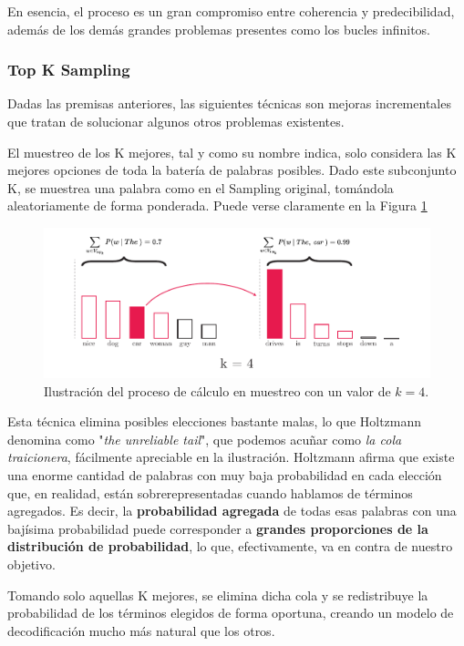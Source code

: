 En esencia, el proceso es un gran compromiso entre coherencia y predecibilidad, además de los demás grandes problemas presentes como los bucles infinitos.

\subsubsection{Top K Sampling}

Dadas las premisas anteriores, las siguientes técnicas son mejoras incrementales que tratan de solucionar algunos otros problemas existentes.

El muestreo de los K mejores, tal y como su nombre indica, solo considera las K mejores opciones de toda la batería de palabras posibles. Dado este subconjunto K, se muestrea una palabra como en el Sampling original, tomándola aleatoriamente de forma ponderada. Puede verse claramente en la Figura \ref{fig:top-k} 


\begin{figure}[h]
	\centering
	\includegraphics[width=.9\textwidth]{media/top k.pdf}
	\caption{Ilustración del proceso de cálculo en muestreo con un valor de $k = 4$.}
	\label{fig:top-k}
\end{figure}

Esta técnica elimina posibles elecciones bastante malas, lo que Holtzmann denomina como "\textit{the unreliable tail}", que podemos acuñar como \textit{la cola traicionera}, fácilmente apreciable en la ilustración. Holtzmann afirma que existe una enorme cantidad de palabras con muy baja probabilidad en cada elección que, en realidad, están sobrerepresentadas cuando hablamos de términos agregados. Es decir, la \textbf{probabilidad agregada} de todas esas palabras con una bajísima probabilidad puede corresponder a \textbf{grandes proporciones de la distribución de probabilidad}, lo que, efectivamente, va en contra de nuestro objetivo.

Tomando solo aquellas K mejores, se elimina dicha cola y se redistribuye la probabilidad de los términos elegidos de forma oportuna, creando un modelo de decodificación mucho más natural que los otros.


